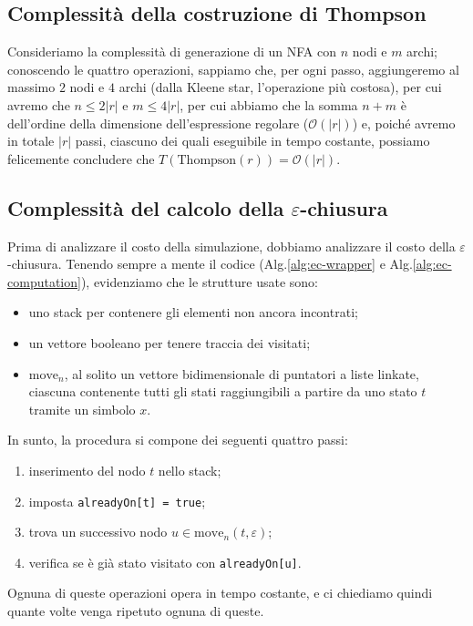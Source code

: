 \documentclass[class=book, crop=false, oneside, 12pt]{standalone}
\begin{document}
\subsection{Complessità della costruzione di Thompson}
Consideriamo la  complessità di generazione di un NFA con \(n\) nodi e \(m\) archi; conoscendo le quattro operazioni, sappiamo che, per ogni passo, aggiungeremo al massimo \(2\) nodi e \(4\) archi (dalla Kleene star, l'operazione più costosa), per cui avremo che \(n \le 2|r|\) e \(m \le 4|r|\), per cui abbiamo che la somma \(n + m\) è dell'ordine della dimensione dell'espressione regolare (\(\mathcal{O}(|r|)\)) e, poiché avremo in totale \(|r|\) passi, ciascuno dei quali eseguibile in tempo costante, possiamo felicemente concludere che \(T(\textrm{Thompson}(r)) = \mathcal{O}(|r|)\).

\subsection{Complessità del calcolo della \texorpdfstring{$\varepsilon$}{Epsilon}-chiusura}
Prima di analizzare il costo della simulazione, dobbiamo analizzare il costo della \(\varepsilon\)-chiusura. Tenendo sempre a mente il codice (Alg.\ref{alg:ec-wrapper} e Alg.\ref{alg:ec-computation}), evidenziamo che le strutture usate sono:
\begin{itemize}
    \item uno stack per contenere gli elementi non ancora incontrati;
    \item un vettore booleano per tenere traccia dei visitati;
    \item \(\textrm{move}_n\), al solito un vettore bidimensionale di puntatori a liste linkate, ciascuna contenente tutti gli stati raggiungibili a partire da uno stato \(t\) tramite un simbolo \(x\).
\end{itemize} 
In sunto, la procedura si compone dei seguenti quattro passi:

\begin{enumerate}
    \item inserimento del nodo \(t\) nello stack;
    \item imposta \texttt{alreadyOn[t] = true};
    \item trova un successivo nodo \(u \in \textrm{move}_n(t, \varepsilon)\);
    \item verifica se è già stato visitato con \texttt{alreadyOn[u]}.
\end{enumerate}

\noindent Ognuna di queste operazioni opera in tempo costante, e ci chiediamo quindi quante volte venga ripetuto ognuna di queste.
\end{document}
